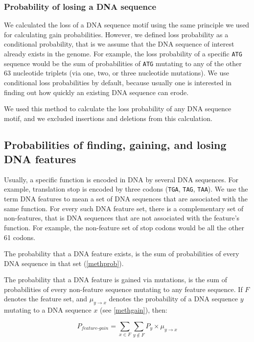 \documentclass[12pt,a4paper]{article}
\begin{document}
\subsubsection{Probability of losing a DNA sequence}

We calculated the loss of a DNA sequence motif using the same principle we used for calculating gain probabilities. However, we defined loss probability as a conditional probability, that is we assume that the DNA sequence of interest already exists in the genome. For example, the loss probability of a specific \texttt{ATG} sequence would be the sum of probabilities of \texttt{ATG} mutating to any of the other 63 nucleotide triplets (via one, two, or three nucleotide mutations). We use conditional loss probabilities by default, because usually one is interested in finding out how quickly an existing DNA sequence can erode.

We used this method to calculate the loss probability of any DNA sequence motif, and we excluded insertions and deletions from this calculation.

\subsection{Probabilities of finding, gaining, and losing DNA features}
\label{methfeatures}

Usually, a specific function is encoded in DNA by several DNA sequences. For example, translation stop is encoded by three codons (\texttt{TGA}, \texttt{TAG}, \texttt{TAA}). We use the term DNA features to mean a set of DNA sequences that are associated with the same function. For every such DNA feature set, there is a complementary set of non-features, that is DNA sequences that are not associated with the feature's function. For example, the non-feature set of stop codons would be all the other 61 codons. 

The probability that a DNA feature exists, is the sum of probabilities of every DNA sequence in that set (\autoref{methprob}).

The probability that a DNA feature is gained via mutations, is the sum of probabilities of every non-feature sequence mutating to any feature sequence. If $F$ denotes the feature set, and $\mu_{y\to x}$ denotes the probability of a DNA sequence $y$ mutating to a DNA sequence $x$ (see \autoref{methgain}), then:

\begin{equation}
P_\textit{feature-gain} = \sum_{x \in F} \sum_{y \notin F} P_y \times \mu_{y\to x}
\end{equation}
\end{document}
